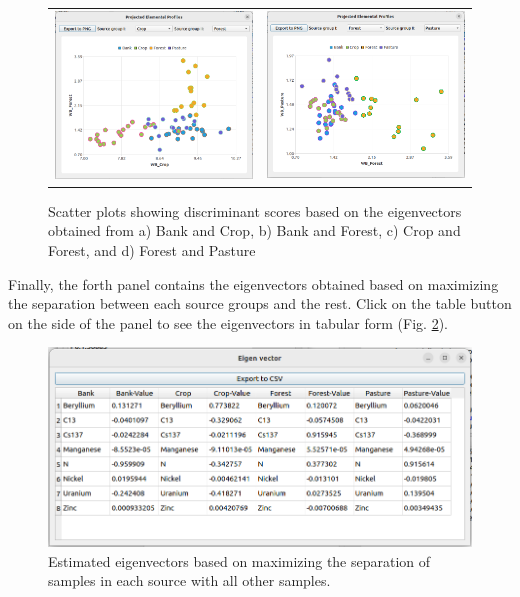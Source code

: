 \documentclass[12pt]{report}
\begin{document}
\begin{figure}[ht]
\begin{tabular}{c c}
        \includegraphics[width=7cm]{Figures/Multiway-Scatter-Crop-Forest.png} & \includegraphics[width=7cm]{Figures/Multiway-Scatter-Forest-Pasture.png}
    \end{tabular}
    
    \caption{Scatter plots showing discriminant scores based on the eigenvectors obtained from a) Bank and Crop, b) Bank and Forest, c) Crop and Forest, and d) Forest and Pasture} 
    \label{fig:Multiway-DFA-scatter-plots}
\end{figure}
\FloatBarrier

Finally, the forth panel contains the eigenvectors obtained based on maximizing the separation between each source groups and the rest. Click on the table button on the side of the panel to see the eigenvectors in tabular form (Fig. \ref{fig:Multiway-eigenvectors}). 

\begin{figure}[ht]
    \centering
    \includegraphics[width=14cm]{Figures/Multiway-DFA-eigenvectors.png}
    \caption{Estimated eigenvectors based on maximizing the separation of samples in each source with all other samples.}
    \label{fig:Multiway-eigenvectors}
\end{figure}
\FloatBarrier
\end{document}
